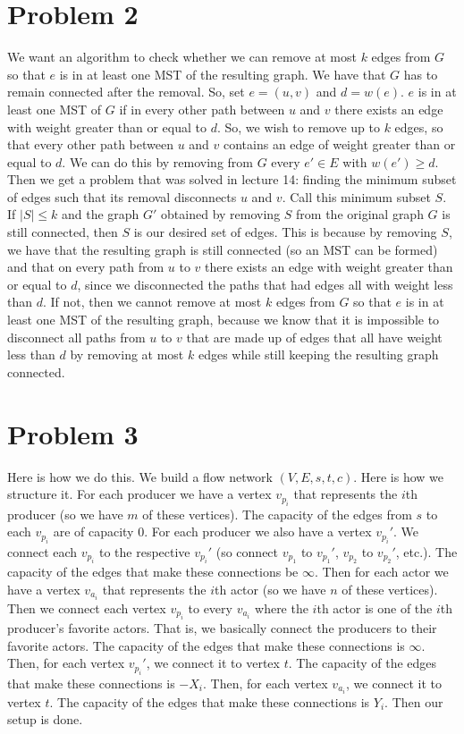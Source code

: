 \documentclass{article}
\begin{document}
\section*{Problem 2}
We want an algorithm to check whether we can remove at most $k$ edges from $G$
so that $e$ is in at least one MST of the resulting graph. We have that $G$ has
to remain connected after the removal. So, set $e = (u,v)$ and $d = w(e)$. $e$
is in at least one MST of $G$ if in every other path between $u$ and $v$ there
exists an edge with weight greater than or equal to $d$. So, we wish to remove
up to $k$ edges, so that every other path between $u$ and $v$ contains an edge
of weight greater than or equal to $d$. We can do this by removing from $G$
every $e' \in E$
with $w(e') \geq d$. Then we get a problem that was solved in lecture 14: finding
the minimum subset of edges such that its removal disconnects $u$ and $v$. Call
this minimum subset $S$. If $|S| \leq k$ and the graph $G'$ obtained by removing
$S$ from the original graph $G$ is still connected, then $S$ is our desired
set of edges. This is because by removing $S$, we have that the resulting graph
is still connected (so an MST can be formed) and that on every path from $u$
to $v$ there exists an edge with weight greater than or equal to $d$, since
we disconnected the paths that had edges all with weight less than $d$. If not,
then we cannot remove at most $k$ edges from $G$ so that $e$ is in at least one
MST of the resulting graph, because we know that it is impossible to disconnect all
paths from $u$ to $v$ that are made up of edges that all have weight less than
$d$ by removing at most $k$ edges while still keeping the resulting graph
connected.

\section*{Problem 3}
Here is how we do this. We build a flow network $(V, E, s, t, c)$.
Here is how we structure it. For each producer we have a vertex
$v_{p_i}$ that represents the $i$th producer (so we have $m$ of these
vertices). The capacity of the edges from $s$ to each $v_{p_i}$ are of capacity
$0$. For each producer we also have a vertex $v_{p_i}'$. We connect
each $v_{p_i}$ to the respective $v_{p_i}'$ (so connect $v_{p_1}$ to $v_{p_1}'$,
$v_{p_2}$ to $v_{p_2}'$, etc.). The capacity of the edges that make
these connections be $\infty$. Then for each actor we have
a vertex $v_{a_i}$ that represents the $i$th actor
(so we have $n$ of these vertices). Then we connect
each vertex $v_{p_i}$ to every $v_{a_i}$ where the $i$th actor is one of the $i$th
producer's favorite actors. That is, we basically connect the producers to
their favorite actors. The capacity of the edges that make these connections
is $\infty$. Then, for each vertex $v_{p_i}'$, we connect it to vertex $t$.
The capacity of the edges that make these connections is $-X_i$. Then,
for each vertex $v_{a_i}$, we connect it to vertex $t$. The capacity
of the edges that make these connections is $Y_i$. Then our setup is done.
\end{document}
